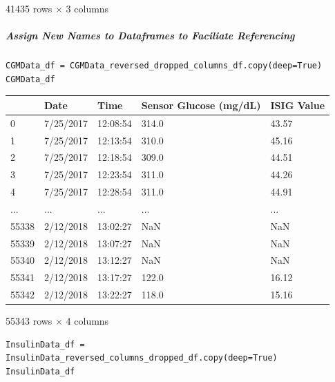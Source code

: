 \bigskip

41435 rows $\times$ 3 columns

\subparagraph{Assign New Names to Dataframes to Faciliate Referencing}

\begin{verbatim}
CGMData_df = CGMData_reversed_dropped_columns_df.copy(deep=True)
CGMData_df
\end{verbatim}

\bigskip\noindent
\begin{tabular}{p{}p{}p{}p{}p{}}
\toprule
 & Date & Time & Sensor Glucose (mg/dL) & ISIG Value \\
\hline
0 & 7/25/2017 & 12:08:54 & 314.0 & 43.57 \\
\hline
1 & 7/25/2017 & 12:13:54 & 310.0 & 45.16 \\
\hline
2 & 7/25/2017 & 12:18:54 & 309.0 & 44.51 \\
\hline
3 & 7/25/2017 & 12:23:54 & 311.0 & 44.26 \\
\hline
4 & 7/25/2017 & 12:28:54 & 311.0 & 44.91 \\
\hline
... & ... & ... & ... & ... \\
\hline
55338 & 2/12/2018 & 13:02:27 & NaN & NaN \\
\hline
55339 & 2/12/2018 & 13:07:27 & NaN & NaN \\
\hline
55340 & 2/12/2018 & 13:12:27 & NaN & NaN \\
\hline
55341 & 2/12/2018 & 13:17:27 & 122.0 & 16.12 \\
\hline
55342 & 2/12/2018 & 13:22:27 & 118.0 & 15.16 \\
\hline
\bottomrule
\end{tabular}

\bigskip

55343 rows $\times$ 4 columns

\begin{verbatim}
InsulinData_df = InsulinData_reversed_columns_dropped_df.copy(deep=True)
InsulinData_df
\end{verbatim}

